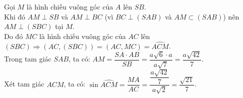 \begin{ex}
{\begin{itemchoice}
			\itemch 
			Gọi $M$ là hình chiếu vuông góc của $A$ lên $SB$. \\ 
			Khi đó  $AM\perp SB$ và $AM\perp BC$ (vì $BC\perp (SAB)$ và $AM\subset (SAB)$) nên $AM\perp (SBC)$ tại $M$. \\
			Do đó $MC$ là hình chiếu vuông góc của $AC$ lên  $(SBC)\Rightarrow (AC,(SBC))=(AC,MC)=\widehat{ACM}$. \\
			 Trong tam giác $SAB$, ta có: $AM=\dfrac{SA\cdot AB}{SB}=\dfrac{a\sqrt{6}\cdot a}{a\sqrt{7}}=\dfrac{a\sqrt{42}}{7}$. \\
			Xét tam giác $ACM$, ta  có: $\sin \widehat{ACM}=\dfrac{MA}{AC}=\dfrac{\dfrac{a\sqrt{42}}{7}}{a\sqrt{2}}=\dfrac{\sqrt{21}}{7}$.
		\end{itemchoice}
	} 
\end{ex}

